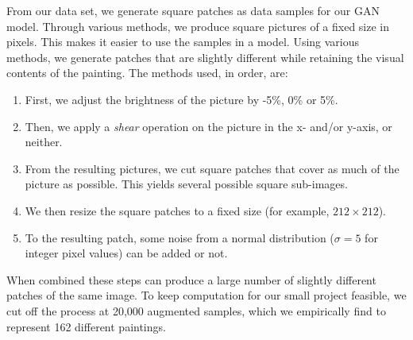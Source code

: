 \documentclass{article}
\begin{document}
From our data set, we  generate square patches as data samples for our GAN model. Through various methods, we produce square pictures of a fixed size in pixels. This makes it easier to use the samples in a model. Using various methods, we generate patches that are slightly different while retaining the visual contents of the painting. The methods used, in order, are:
\begin{enumerate} \setlength{\itemsep}{0pt} %
    \item First, we adjust the brightness of the picture by -5\%, 0\% or 5\%.
    \item Then, we apply a \emph{shear} operation on the picture in the x- and/or y-axis, or neither.
    \item From the resulting pictures, we cut square patches that cover as much of the picture as possible. This yields several possible square sub-images.
    \item We then resize the square patches to a fixed size (for example, $212 \times 212$).
    \item To the resulting patch, some noise from a normal distribution ($\sigma = 5$ for integer pixel values) can be added or not.
\end{enumerate}
When combined these steps can produce a large number of slightly different patches of the same image. To keep computation for our small project feasible, we cut off the process at 20,000 augmented samples, which we empirically find to represent 162 different paintings.
\end{document}
